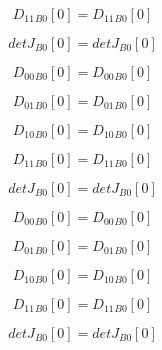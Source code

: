 \documentclass{article}
\begin{document}
\begin{dmath}{D_{11}{_{B0}}}[{0}] = {D_{11}{_{B0}}}[{0}]\end{dmath}

\begin{dmath}{detJ{_{B0}}}[{0}] = {detJ{_{B0}}}[{0}]\end{dmath}

\begin{dmath}{D_{00}{_{B0}}}[{0}] = {D_{00}{_{B0}}}[{0}]\end{dmath}

\begin{dmath}{D_{01}{_{B0}}}[{0}] = {D_{01}{_{B0}}}[{0}]\end{dmath}

\begin{dmath}{D_{10}{_{B0}}}[{0}] = {D_{10}{_{B0}}}[{0}]\end{dmath}

\begin{dmath}{D_{11}{_{B0}}}[{0}] = {D_{11}{_{B0}}}[{0}]\end{dmath}

\begin{dmath}{detJ{_{B0}}}[{0}] = {detJ{_{B0}}}[{0}]\end{dmath}

\begin{dmath}{D_{00}{_{B0}}}[{0}] = {D_{00}{_{B0}}}[{0}]\end{dmath}

\begin{dmath}{D_{01}{_{B0}}}[{0}] = {D_{01}{_{B0}}}[{0}]\end{dmath}

\begin{dmath}{D_{10}{_{B0}}}[{0}] = {D_{10}{_{B0}}}[{0}]\end{dmath}

\begin{dmath}{D_{11}{_{B0}}}[{0}] = {D_{11}{_{B0}}}[{0}]\end{dmath}

\begin{dmath}{detJ{_{B0}}}[{0}] = {detJ{_{B0}}}[{0}]\end{dmath}
\end{document}
